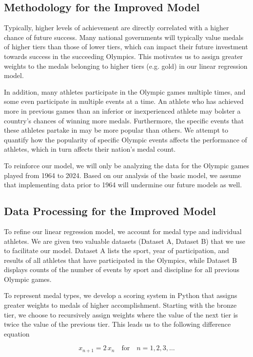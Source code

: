 \documentclass{mcmthesis}
\begin{document}
\subsection{Methodology for the Improved Model}
Typically, higher levels of achievement are directly correlated with a higher chance of future success. Many national governments will typically value medals of higher tiers than those of lower tiers, which can impact their future investment towards success in the succeeding Olympics. This motivates us to assign greater weights to the medals belonging to higher tiers (e.g. gold) in our linear regression model. \par 
In addition, many athletes participate in the Olympic games multiple times, and some even participate in multiple events at a time. An athlete who has achieved more in previous games than an inferior or inexperienced athlete may bolster a country's chances of winning more medals. Furthermore, the specific events that these athletes partake in may be more popular than others. We attempt to quantify how the popularity of specific Olympic events affects the performance of athletes, which in turn affects their nation's medal count. \par
To reinforce our model, we will only be analyzing the data for the Olympic games played from 1964 to 2024. Based on our analysis of the basic model, we assume that implementing data prior to 1964 will undermine our future models as well. 

\subsection{Data Processing for the Improved Model}
To refine our linear regression model, we account for medal type and individual athletes. We are given two valuable datasets (Dataset A, Dataset B) that we use to facilitate our model. Dataset A lists the sport, year of participation, and results of all athletes that have participated in the Olympics, while Dataset B displays counts of the number of events by sport and discipline for all previous Olympic games. \par
To represent medal types, we develop a scoring system in Python that assigns greater weights to medals of higher accomplishment. Starting with the bronze tier, we choose to recursively assign weights where the value of the next tier is twice the value of the previous tier. This leads us to the following difference equation

\begin{equation}
x_{n+1} = 2\,x_n \quad \text{for} \quad n = 1, 2, 3,\dots
\end{equation}
\end{document}
